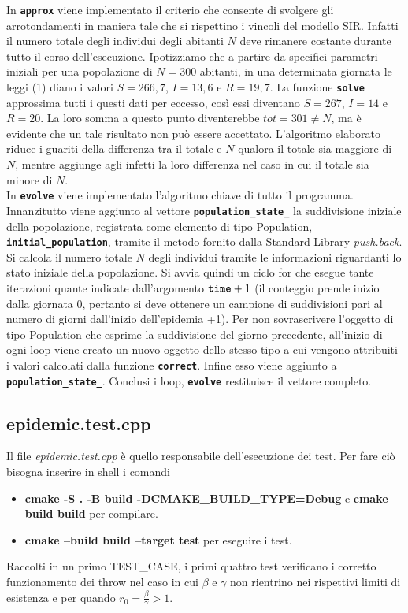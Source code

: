\documentclass[11pt, a4paper, left=3.5cm, right=3.5cm]{article}
\begin{document}
In \textbf{\texttt{approx}} viene implementato il criterio che consente di svolgere gli arrotondamenti in maniera tale che si rispettino i vincoli del modello SIR. Infatti il numero totale degli individui degli abitanti $N$ deve rimanere costante durante tutto il corso dell'esecuzione. Ipotizziamo che a partire da specifici parametri iniziali per una popolazione di $N=300$ abitanti, in una determinata giornata le leggi (1) diano i valori $S=266,7$, $I=13,6$ e $R=19,7$. La funzione \textbf{\texttt{solve}} approssima tutti i questi dati per eccesso, cos\`{i} essi diventano $S=267$, $I=14$ e $R=20$. La loro somma a questo punto diventerebbe $tot=301\neq N$, ma \`{e} evidente che un tale risultato non pu\`{o} essere accettato. L'algoritmo elaborato riduce i guariti della differenza tra il totale e $N$ qualora il totale sia maggiore di $N$, mentre aggiunge agli infetti la loro differenza nel caso in cui il totale sia minore di $N$. \\

In \textbf{\texttt{evolve}} viene implementato l'algoritmo chiave di tutto il programma. Innanzitutto viene aggiunto al vettore \textbf{\texttt{population\_state\_}} la suddivisione iniziale della popolazione, registrata come elemento di tipo Population, \textbf{\texttt{initial\_population}}, tramite il metodo fornito dalla Standard Library \textit{push.back}. Si calcola il numero totale $N$ degli individui tramite le informazioni riguardanti lo stato iniziale della popolazione.
Si avvia quindi un ciclo for che esegue tante iterazioni quante indicate dall'argomento $\textbf{\texttt{time}} + 1$ (il conteggio prende inizio dalla giornata 0, pertanto si deve ottenere un campione di suddivisioni pari al numero di giorni dall'inizio dell'epidemia +1). Per non sovrascrivere l'oggetto di tipo Population che esprime la suddivisione del giorno precedente, all'inizio di ogni loop viene creato un nuovo oggetto dello stesso tipo a cui vengono attribuiti i valori calcolati dalla funzione \textbf{\texttt{correct}}. Infine esso viene aggiunto a \textbf{\texttt{population\_state\_}}. Conclusi i loop, \textbf{\texttt{evolve}} restituisce il vettore completo.

\subsection{epidemic.test.cpp}
Il file \textit{epidemic.test.cpp} \`{e} quello responsabile dell'esecuzione dei test. Per fare ci\`{o} bisogna inserire in shell i comandi
\begin{itemize}
\item 
\textbf{cmake -S . -B build -DCMAKE\_BUILD\_TYPE=Debug} e 
    \textbf{cmake --build build} per compilare.  %
\item \textbf{cmake --build build --target test} per eseguire i test.
\end{itemize}
Raccolti in un primo TEST\_CASE, i primi quattro test verificano i corretto funzionamento dei throw nel caso in cui $\beta$ e $\gamma$ non rientrino nei rispettivi limiti di esistenza e per quando $r_0=\frac{\beta}{\gamma}>1$.  \\
\end{document}
